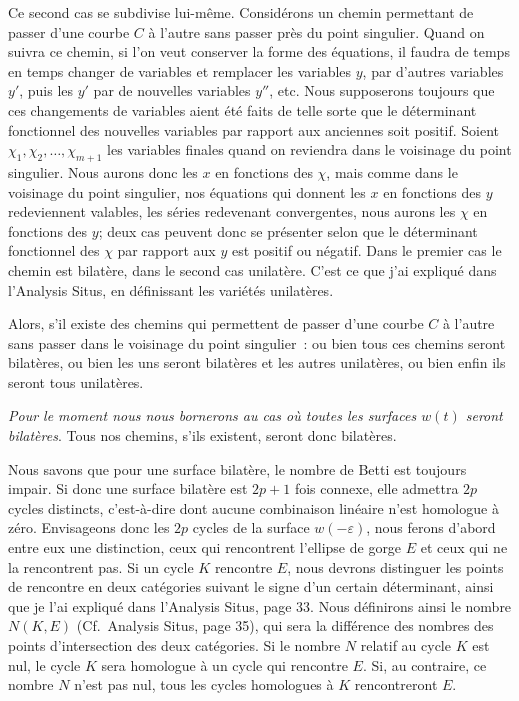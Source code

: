 \documentclass{article}
\begin{document}
Ce second cas se subdivise lui-même. Considérons un chemin permettant de passer d'une courbe $C$ à l'autre sans passer près du point singulier. Quand on suivra ce chemin, si l'on veut conserver la forme des équations, il faudra de temps en temps changer de variables et remplacer les variables $y$, par d'autres variables $y'$, puis les $y'$ par de nouvelles variables $y''$, etc. Nous supposerons toujours que ces changements de variables aient été faits de telle sorte que le déterminant fonctionnel des nouvelles variables par rapport aux anciennes soit positif. Soient $\chi_{1}, \chi_{2}, \ldots, \chi_{m+1}$ les variables finales quand on reviendra dans le voisinage du point singulier. Nous aurons donc les $x$ en fonctions des $\chi$, mais comme dans le voisinage du point singulier, nos équations qui donnent les $x$ en fonctions des $y$ redeviennent valables, les séries redevenant convergentes, nous aurons les $\chi$ en fonctions des $y$; deux cas peuvent donc se présenter selon que le déterminant fonctionnel des $\chi$ par rapport aux $y$ est positif ou négatif. Dans le premier cas le chemin est bilatère, dans le second cas unilatère. C'est ce que j'ai expliqué dans l'Analysis Situs, en définissant les variétés unilatères.


Alors, s'il existe des chemins qui permettent de passer d'une courbe $C$ à l'autre sans passer dans le voisinage du point singulier~: ou bien tous ces chemins seront bilatères, ou bien les uns seront bilatères et les autres unilatères, ou bien enfin ils seront tous unilatères.

\emph{Pour le moment nous nous bornerons au cas où toutes les surfaces $w(t)$ seront bilatères}. Tous nos chemins, s'ils existent, seront donc bilatères.

Nous savons que pour une surface bilatère, le nombre de Betti est toujours impair. Si donc une surface bilatère est $2p + 1$ fois connexe, elle admettra $2p$ cycles distincts, c'est-à-dire dont aucune combinaison linéaire n'est homologue à zéro. Envisageons donc les $2p$ cycles de la surface $w(-\varepsilon)$, nous ferons d'abord entre eux une distinction, ceux qui rencontrent l'ellipse de gorge $E$ et ceux qui ne la rencontrent pas. Si un cycle $K$ rencontre $E$, nous devrons distinguer les points de rencontre en deux catégories suivant le signe d'un certain déterminant, ainsi que je l'ai expliqué dans l'Analysis Situs, page 33. Nous définirons ainsi le nombre $N(K, E)$ (Cf.\ Analysis Situs, page 35), qui sera la différence des nombres des points d'intersection des deux catégories. Si le nombre $N$ relatif au cycle $K$ est nul, le cycle $K$ sera homologue à un cycle qui rencontre $E$. Si, au contraire, ce nombre $N$ n'est pas nul, tous les cycles homologues à $K$ rencontreront $E$.
\end{document}
